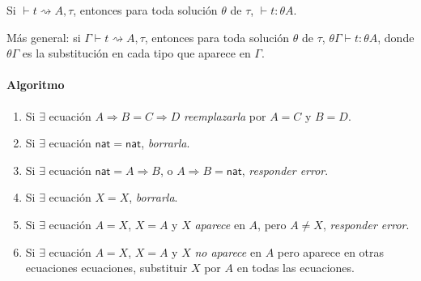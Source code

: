 \documentclass[twoside,a4paper,12pt]{article}
\theoremstyle{definition}
\theoremstyle{remark}
\newcommand\nat{\ensuremath{\mathsf{nat}}}
\begin{document}
\begin{teorema}
  Si $\vdash t\rightsquigarrow A,\tau$, entonces para toda solución $\theta$ de
  $\tau$, $\vdash t:\theta A$.

  Más general: si $\Gamma\vdash t\rightsquigarrow A,\tau$, entonces para toda
  solución $\theta$ de $\tau$, $\theta\Gamma\vdash t:\theta A$, donde
  $\theta\Gamma$ es la substitución en cada tipo que aparece en $\Gamma$.
\end{teorema}

\paragraph{Algoritmo}
\begin{enumerate}
  \item Si $\exists$ ecuación $A\Rightarrow B=C\Rightarrow D$ \emph{reemplazarla}
    por $A=C$ y $B=D$.
  \item Si $\exists$ ecuación $\nat=\nat$, \emph{borrarla}.
  \item Si $\exists$ ecuación $\nat=A\Rightarrow B$, o $A\Rightarrow B=\nat$, \emph{responder error}.
  \item Si $\exists$ ecuación $X=X$, \emph{borrarla}.
  \item Si $\exists$ ecuación $A=X$, $X=A$ y $X$ \emph{aparece} en $A$, pero $A\neq X$, \emph{responder error}.
  \item Si $\exists$ ecuación $A=X$, $X=A$ y $X$ \emph{no aparece} en $A$ pero
    aparece en otras ecuaciones ecuaciones, substituir $X$ por $A$ en todas las
    ecuaciones.
\end{enumerate}
\end{document}
